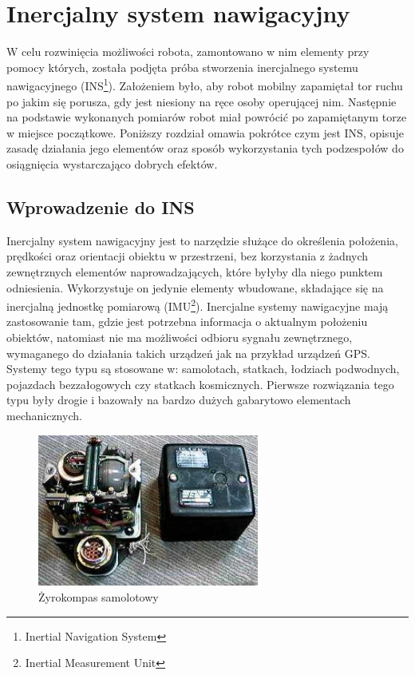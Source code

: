 \section{Inercjalny system nawigacyjny}
W celu rozwinięcia możliwości robota, zamontowano w nim elementy przy pomocy
których, została podjęta próba stworzenia inercjalnego systemu nawigacyjnego
(INS\footnote{Inertial Navigation System}). Założeniem było, aby robot mobilny
zapamiętał tor ruchu po jakim się porusza, gdy jest niesiony na ręce
osoby operującej nim. Następnie na podstawie wykonanych pomiarów robot miał
powrócić po zapamiętanym torze w miejsce początkowe. Poniższy rozdział omawia
pokrótce czym jest INS, opisuje zasadę działania jego elementów oraz sposób
wykorzystania tych podzespołów do osiągnięcia wystarczająco dobrych efektów.

\subsection{Wprowadzenie do INS}

Inercjalny system nawigacyjny jest to narzędzie służące do określenia położenia,
prędkości oraz orientacji obiektu w przestrzeni, bez korzystania z żadnych
zewnętrznych elementów naprowadzających, które byłyby dla niego punktem
odniesienia. Wykorzystuje on jedynie elementy wbudowane, składające się na
inercjalną jednostkę pomiarową (IMU\footnote{Inertial Measurement Unit}).
Inercjalne systemy nawigacyjne mają zastosowanie tam, gdzie jest potrzebna
informacja o aktualnym położeniu obiektów, natomiast nie ma możliwości odbioru
sygnału zewnętrznego, wymaganego do działania takich urządzeń jak na przykład urządzeń GPS. 
Systemy tego typu są stosowane w: samolotach, statkach, łodziach podwodnych, pojazdach
bezzałogowych czy statkach kosmicznych. Pierwsze rozwiązania tego typu były drogie i bazowały na bardzo
dużych gabarytowo elementach mechanicznych. 
\begin{figure}[!ht]
 \centering
 \includegraphics[height=50mm]{../images/ch04/gyrocompass.jpg}
 \caption[ZyroSam]{Żyrokompas samolotowy\footnotemark}
 \label{fig:Zyrokompas}
\end{figure}

